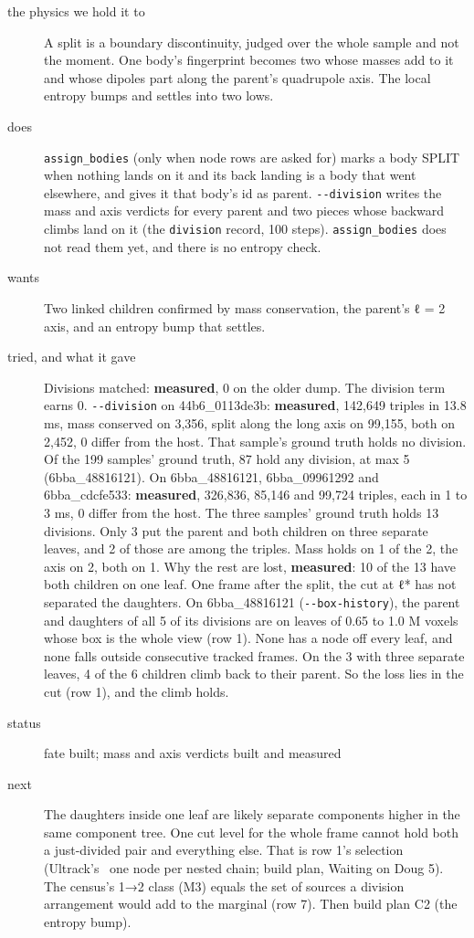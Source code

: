 \begin{description}
\item[{the physics we hold it to}] A split is a boundary discontinuity, judged over the whole sample and not the moment. One body's fingerprint becomes two whose masses add to it and whose dipoles part along the parent's quadrupole axis. The local entropy bumps and settles into two lows.
\item[{does}] \texttt{assign\_\allowbreak{}bodies} (only when node rows are asked for) marks a body SPLIT when nothing lands on it and its back landing is a body that went elsewhere, and gives it that body's id as parent. \texttt{-\allowbreak{}-\allowbreak{}division} writes the mass and axis verdicts for every parent and two pieces whose backward climbs land on it (the \texttt{division} record, 100 steps). \texttt{assign\_\allowbreak{}bodies} does not read them yet, and there is no entropy check.
\item[{wants}] Two linked children confirmed by mass conservation, the parent's ℓ = 2 axis, and an entropy bump that settles.
\item[{tried, and what it gave}] Divisions matched: \textbf{measured}, 0 on the older dump. The division term earns 0. \texttt{-\allowbreak{}-\allowbreak{}division} on 44b6\_\allowbreak{}0113de3b: \textbf{measured}, 142,649 triples in 13.8 ms, mass conserved on 3,356, split along the long axis on 99,155, both on 2,452, 0 differ from the host. That sample's ground truth holds no division. Of the 199 samples' ground truth, 87 hold any division, at max 5 (6bba\_\allowbreak{}48816121). On 6bba\_\allowbreak{}48816121, 6bba\_\allowbreak{}09961292 and 6bba\_\allowbreak{}cdcfe533: \textbf{measured}, 326,836, 85,146 and 99,724 triples, each in 1 to 3 ms, 0 differ from the host. The three samples' ground truth holds 13 divisions. Only 3 put the parent and both children on three separate leaves, and 2 of those are among the triples. Mass holds on 1 of the 2, the axis on 2, both on 1. Why the rest are lost, \textbf{measured}: 10 of the 13 have both children on one leaf. One frame after the split, the cut at ℓ* has not separated the daughters. On 6bba\_\allowbreak{}48816121 (\texttt{-\allowbreak{}-\allowbreak{}box-\allowbreak{}history}), the parent and daughters of all 5 of its divisions are on leaves of 0.65 to 1.0 M voxels whose box is the whole view (row 1). None has a node off every leaf, and none falls outside consecutive tracked frames. On the 3 with three separate leaves, 4 of the 6 children climb back to their parent. So the loss lies in the cut (row 1), and the climb holds.
\item[{status}] fate built; mass and axis verdicts built and measured
\item[{next}] The daughters inside one leaf are likely separate components higher in the same component tree. One cut level for the whole frame cannot hold both a just-divided pair and everything else. That is row 1's selection (Ultrack's~\cite{src:Ultrack} one node per nested chain; build plan, Waiting on Doug 5). The census's 1→2 class (M3) equals the set of sources a division arrangement would add to the marginal (row 7). Then build plan C2 (the entropy bump).
\end{description}

